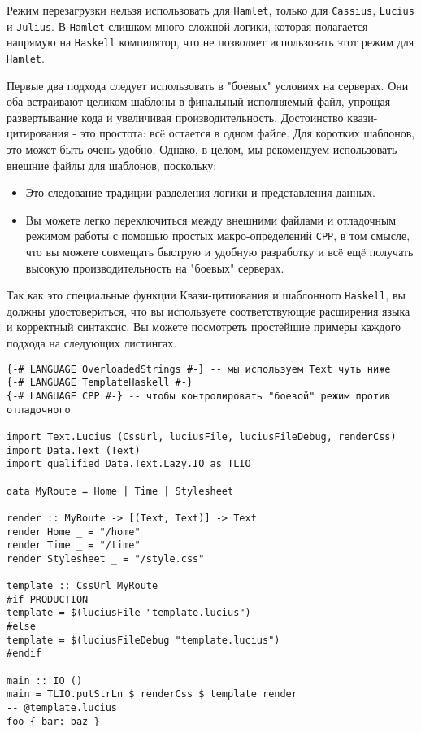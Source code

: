 \begin{remark}
Режим перезагрузки нельзя использовать для \texttt{Hamlet}, только для \texttt{Cassius}, \texttt{Lucius} и \texttt{Julius}.
В \texttt{Hamlet} слишком много сложной логики, которая полагается напрямую на \texttt{Haskell}
компилятор, что не позволяет использовать этот режим для \texttt{Hamlet}.
\end{remark}

Первые два подхода следует использовать в "боевых" условиях на серверах.
Они оба встраивают целиком шаблоны в финальный исполняемый файл, упрощая
развертывание кода и увеличивая производительность.
Достоинство квази-цитирования - это простота: всë остается в одном файле.
Для коротких шаблонов, это может быть очень удобно. Однако, в целом, мы рекомендуем
использовать внешние файлы для шаблонов, поскольку:

\begin{itemize}
\item Это следование традиции разделения логики и представления данных.
\item Вы можете легко переключиться между внешними файлами и отладочным режимом
работы с помощью простых макро-определений \texttt{CPP}, в том смысле, что вы
можете совмещать быструю и удобную разработку и всë ещë получать высокую
производительность на "боевых" серверах.
\end{itemize}

Так как это специальные функции Квази-цитиования и шаблонного \texttt{Haskell}, вы
должны удостовериться, что вы используете соответствующие расширения языка
и корректный синтаксис. Вы можете посмотреть простейшие примеры каждого подхода
на следующих листингах.


\begin{lstlisting}[caption=Внешние файлы]
{-# LANGUAGE OverloadedStrings #-} -- мы используем Text чуть ниже
{-# LANGUAGE TemplateHaskell #-}
{-# LANGUAGE CPP #-} -- чтобы контролировать "боевой" режим против отладочного

import Text.Lucius (CssUrl, luciusFile, luciusFileDebug, renderCss)
import Data.Text (Text)
import qualified Data.Text.Lazy.IO as TLIO

data MyRoute = Home | Time | Stylesheet

render :: MyRoute -> [(Text, Text)] -> Text
render Home _ = "/home"
render Time _ = "/time"
render Stylesheet _ = "/style.css"

template :: CssUrl MyRoute
#if PRODUCTION
template = $(luciusFile "template.lucius")
#else
template = $(luciusFileDebug "template.lucius")
#endif

main :: IO ()
main = TLIO.putStrLn $ renderCss $ template render
-- @template.lucius
foo { bar: baz }
\end{lstlisting}

